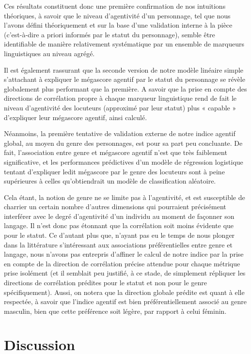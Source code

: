 \bigskip
Ces résultats constituent donc une première confirmation de nos intuitions théoriques, à savoir que le niveau d'agentivité d'un personnage, tel que nous l'avons défini théoriquement et sur la base d'une validation interne à la pièce (c'est-à-dire a priori informés par le statut du personnage), semble être identifiable de manière relativement systématique par un ensemble de marqueurs linguistiques au niveau agrégé. 

Il est également rassurant que la seconde version de notre modèle linéaire simple s’attachant à expliquer le mégascore agentif par le statut du personnage se révèle globalement plus performant que la première. A savoir que la prise en compte des directions de corrélation propre à chaque marqueur linguistique rend de fait le niveau d’agentivité des locuteurs (approximé par leur statut) plus « capable » d’expliquer leur mégascore agentif, ainsi calculé.

Néanmoins, la première tentative de validation externe de notre indice agentif global, au moyen du genre des personnages, est pour sa part peu concluante. De fait, l’association entre genre et mégascore agentif n’est que très faiblement significative, et les performances prédictives d’un modèle de régression logistique tentant d’expliquer ledit mégascore par le genre des locuteurs sont à peine supérieures à celles qu’obtiendrait un modèle de classification aléatoire. 

Cela étant, la notion de genre ne se limite pas à l’agentivité, et est susceptible de charrier un certain nombre d’autres dimensions qui pourraient précisément interférer avec le degré d’agentivité d’un individu au moment de façonner son langage. Il n’est donc pas étonnant que la corrélation soit moins évidente que pour le statut. Ce d'autant plus que, n'ayant pas eu le temps de nous plonger dans la littérature s'intéressant aux associations préférentielles entre genre et langage, nous n'avons pas entrepris d'affiner le calcul de notre indice par la prise en compte de la direction de corrélation précise attendue pour chaque métrique prise isolément (et il semblait peu justifié, à ce stade, de simplement répliquer les directions de corrélation prédites pour le statut et non pour le genre spécifiquement). Aussi, on notera que la direction globale prédite est quant à elle respectée, à savoir que l’indice agentif est bien préférentiellement associé au genre masculin, bien que cette préférence soit légère, par rapport à celui féminin.

\chapter{Discussion}

